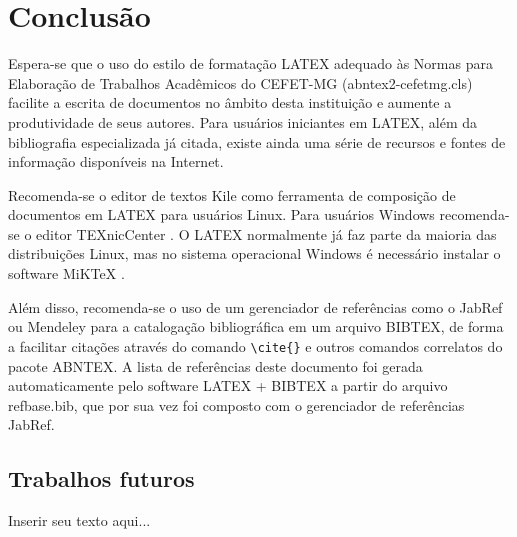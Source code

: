 %
%

\chapter{Conclusão}
\label{chap:conclusao}

Espera-se que o uso do estilo de formatação LATEX adequado às Normas para Elaboração de Trabalhos Acadêmicos do CEFET-MG ({\ttfamily abntex2-cefetmg.cls}) facilite a escrita de documentos no âmbito desta instituição e aumente a produtividade de seus autores. Para usuários iniciantes em LATEX, além da bibliografia especializada já citada, existe ainda uma série de recursos \cite{CTAN2009} e fontes de informação \cite{TeX-Br2009,Wikibooks2009} disponíveis na Internet.

Recomenda-se o editor de textos Kile como ferramenta de composição de documentos em LATEX para usuários Linux. Para usuários Windows recomenda-se o editor TEXnicCenter \cite{TeXnicCenter2009}. O LATEX normalmente já faz parte da maioria das distribuições Linux, mas no sistema operacional Windows é necessário instalar o software MiKTeX \cite{MiKTeX2009}.

Além disso, recomenda-se o uso de um gerenciador de referências como o JabRef \cite{JabRef2009} ou Mendeley \cite{Mendeley2009} para a catalogação bibliográfica em um arquivo BIBTEX, de forma a facilitar citações através do comando \verb#\cite{}# e outros comandos correlatos do pacote ABNTEX. A lista de referências deste documento foi gerada automaticamente pelo software LATEX + BIBTEX a partir do arquivo {\ttfamily refbase.bib}, que por sua vez foi composto com o gerenciador de referências JabRef.

\section{Trabalhos futuros}
\label{sec:trabalhosFuturos}

Inserir seu texto aqui...
